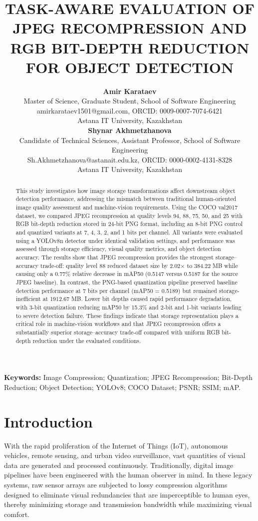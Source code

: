 \documentclass[12pt, a4paper]{article}
\title{TASK-AWARE EVALUATION OF JPEG RECOMPRESSION AND RGB BIT-DEPTH REDUCTION FOR OBJECT DETECTION}
\author{
  \textbf{Amir Karataev} \\
  \small Master of Science, Graduate Student, School of Software Engineering \\
  \small amirkarataev1501@gmail.com, ORCID: 0009-0007-7074-6421 \\
  \small Astana IT University, Kazakhstan \\
  \textbf{Shynar Akhmetzhanova} \\
  \small Candidate of Technical Sciences, Assistant Professor, School of Software Engineering \\
  \small Sh.Akhmetzhanova@astanait.edu.kz, ORCID: 0000-0002-4131-8328 \\
  \small Astana IT University, Kazakhstan
}
\date{}
\begin{document}
\maketitle

\begin{abstract}
This study investigates how image storage transformations affect downstream object detection performance, addressing the mismatch between traditional human-oriented image quality assessment and machine-vision requirements. Using the COCO val2017 dataset, we compared JPEG recompression at quality levels 94, 88, 75, 50, and 25 with RGB bit-depth reduction stored in 24-bit PNG format, including an 8-bit PNG control and quantized variants at 7, 4, 3, 2, and 1 bits per channel. All variants were evaluated using a YOLOv8n detector under identical validation settings, and performance was assessed through storage efficiency, visual quality metrics, and object detection accuracy. The results show that JPEG recompression provides the strongest storage–accuracy trade-off: quality level 88 reduced dataset size by 2.02$\times$ to 384.22 MB while causing only a 0.77\% relative decrease in mAP50 (0.5147 versus 0.5187 for the source JPEG baseline). In contrast, the PNG-based quantization pipeline preserved baseline detection performance at 7 bits per channel (mAP50 = 0.5189) but remained storage-inefficient at 1912.67 MB. Lower bit depths caused rapid performance degradation, with 3-bit quantization reducing mAP50 by 15.3\% and 2-bit and 1-bit variants leading to severe detection failure. These findings indicate that storage representation plays a critical role in machine-vision workflows and that JPEG recompression offers a substantially superior storage–accuracy trade-off compared with uniform RGB bit-depth reduction under the evaluated conditions.
\end{abstract}

\noindent \textbf{Keywords:} Image Compression; Quantization; JPEG Recompression; Bit-Depth Reduction; Object Detection; YOLOv8; COCO Dataset; PSNR; SSIM; mAP.

\section{Introduction}
With the rapid proliferation of the Internet of Things (IoT), autonomous vehicles, remote sensing, and urban video surveillance, vast quantities of visual data are generated and processed continuously. Traditionally, digital image pipelines have been engineered with the human observer in mind. In these legacy systems, raw sensor arrays are subjected to lossy compression algorithms designed to eliminate visual redundancies that are imperceptible to human eyes, thereby minimizing storage and transmission bandwidth while maximizing visual comfort. 
\end{document}
